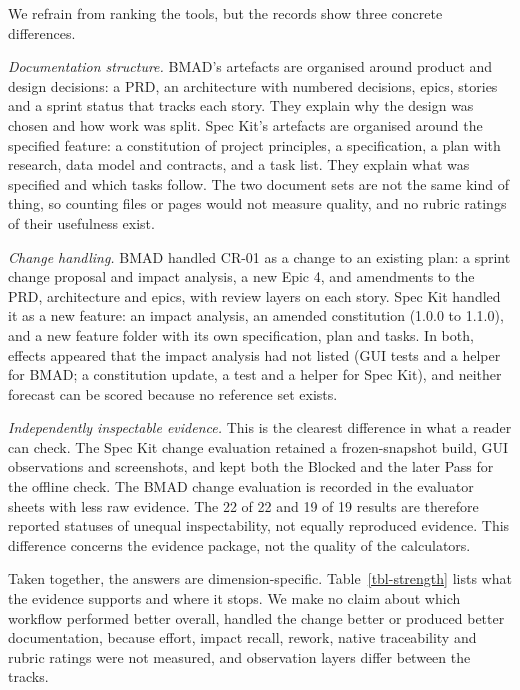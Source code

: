 \documentclass[conference]{IEEEtran}
\begin{document}
We refrain from ranking the tools, but the records show three concrete
differences.

\emph{Documentation structure.} BMAD's artefacts are organised around
product and design decisions: a PRD, an architecture with numbered
decisions, epics, stories and a sprint status that tracks each story.
They explain why the design was chosen and how work was split. Spec
Kit's artefacts are organised around the specified feature: a
constitution of project principles, a specification, a plan with
research, data model and contracts, and a task list. They explain what
was specified and which tasks follow. The two document sets are not the
same kind of thing, so counting files or pages would not measure
quality, and no rubric ratings of their usefulness exist.

\emph{Change handling.} BMAD handled CR-01 as a change to an existing
plan: a sprint change proposal and impact analysis, a new Epic 4, and
amendments to the PRD, architecture and epics, with review layers on
each story. Spec Kit handled it as a new feature: an impact analysis, an
amended constitution (1.0.0 to 1.1.0), and a new feature folder with its
own specification, plan and tasks. In both, effects appeared that the
impact analysis had not listed (GUI tests and a helper for BMAD; a
constitution update, a test and a helper for Spec Kit), and neither
forecast can be scored because no reference set exists.

\emph{Independently inspectable evidence.} This is the clearest
difference in what a reader can check. The Spec Kit change evaluation
retained a frozen-snapshot build, GUI observations and screenshots, and
kept both the Blocked and the later Pass for the offline check. The BMAD
change evaluation is recorded in the evaluator sheets with less raw
evidence. The 22 of 22 and 19 of 19 results are therefore reported
statuses of unequal inspectability, not equally reproduced evidence.
This difference concerns the evidence package, not the quality of the
calculators.

Taken together, the answers are dimension-specific.
Table~\ref{tbl-strength} lists what the evidence supports and
where it stops. We make no claim about which workflow performed better
overall, handled the change better or produced better documentation,
because effort, impact recall, rework, native traceability and rubric
ratings were not measured, and observation layers differ between the
tracks.
\end{document}
